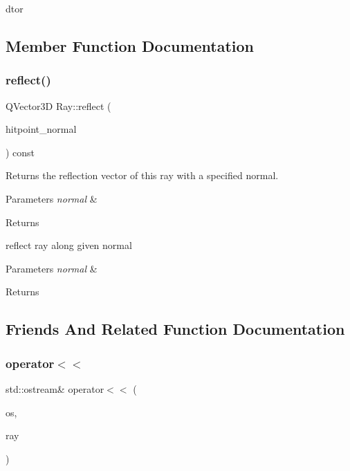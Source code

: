 d\textquotesingle{}tor 

\subsection{Member Function Documentation}
\mbox{\label{struct_ray_aaa4b1d97ddd42e6a4a880b0854f0e84e}} 
\subsubsection{\texorpdfstring{reflect()}{reflect()}}
{\footnotesize\ttfamily Q\+Vector3D Ray\+::reflect (\begin{DoxyParamCaption}\item[{Q\+Vector3D const \&}]{hitpoint\+\_\+normal }\end{DoxyParamCaption}) const}



Returns the reflection vector of this ray with a specified normal. 


\begin{DoxyParams}{Parameters}
{\em normal} & \\
\hline
\end{DoxyParams}
\begin{DoxyReturn}{Returns}

\end{DoxyReturn}
reflect ray along given normal 
\begin{DoxyParams}{Parameters}
{\em normal} & \\
\hline
\end{DoxyParams}
\begin{DoxyReturn}{Returns}

\end{DoxyReturn}


\subsection{Friends And Related Function Documentation}
\mbox{\label{struct_ray_a5c8a3bf0a8e125a67943f442cbbf8e06}} 
\subsubsection{\texorpdfstring{operator$<$$<$}{operator<<}}
{\footnotesize\ttfamily std\+::ostream\& operator$<$$<$ (\begin{DoxyParamCaption}\item[{std\+::ostream \&}]{os,  }\item[{const \mbox{\hyperlink{struct_ray}{Ray}} \&}]{ray }\end{DoxyParamCaption})\hspace{0.3cm}{\ttfamily [friend]}}



